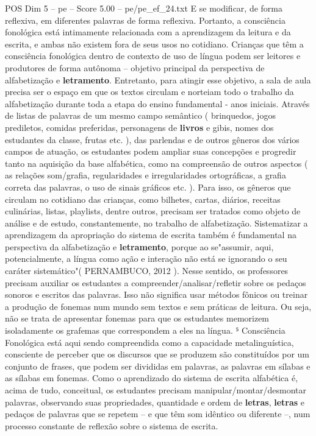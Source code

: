 \begin{textsample}{POS Dim 5 – pe – Score 5.00 – pe/pe\_ef\_24.txt}
E se modificar, de forma reflexiva, em diferentes palavras de forma reflexiva.
Portanto, a consciência fonológica está intimamente relacionada com a aprendizagem da leitura e da escrita, e ambas não existem fora de seus usos no cotidiano.
Crianças que têm a consciência fonológica dentro de contexto de uso de língua podem ser leitores e produtores de forma autônoma – objetivo principal da perspectiva de alfabetização e \textbf{letramento}.
Entretanto, para atingir esse objetivo, a sala de aula precisa ser o espaço em que os textos circulam e norteiam todo o trabalho da alfabetização durante toda a etapa do ensino fundamental - anos iniciais.
Através de listas de palavras de um mesmo campo semântico ( brinquedos, jogos prediletos, comidas preferidas, personagens de \textbf{livros} e gibis, nomes dos estudantes da classe, frutas etc. ), das parlendas e de outros gêneros dos vários campos de atuação, os estudantes podem ampliar suas concepções e progredir tanto na aquisição da base alfabética, como na compreensão de outros aspectos ( as relações som/grafia, regularidades e irregularidades ortográficas, a grafia correta das palavras, o uso de sinais gráficos etc. ).
Para isso, os gêneros que circulam no cotidiano das crianças, como bilhetes, cartas, diários, receitas culinárias, listas, playlists, dentre outros, precisam ser tratados como objeto de análise e de estudo, constantemente, no trabalho de alfabetização.
Sistematizar a aprendizagem da apropriação do sistema de escrita também é fundamental na perspectiva da alfabetização e \textbf{letramento}, porque ao se"assumir, aqui, potencialmente, a língua como ação e interação não está se ignorando o seu caráter sistemático"( PERNAMBUCO, 2012 ).
Nesse sentido, os professores precisam auxiliar os estudantes a compreender/analisar/refletir sobre os pedaços sonoros e escritos das palavras.
Isso não significa usar métodos fônicos ou treinar a produção de fonemas num mundo sem textos e sem práticas de leitura.
Ou seja, não se trata de apresentar fonemas para que os estudantes memorizem isoladamente os grafemas que correspondem a eles na língua. ⁵ Consciência Fonológica está aqui sendo compreendida como a capacidade metalinguística, consciente de perceber que os discursos que se produzem são constituídos por um conjunto de frases, que podem ser divididas em palavras, as palavras em sílabas e as sílabas em fonemas.
Como o aprendizado do sistema de escrita alfabética é, acima de tudo, conceitual, os estudantes precisam manipular/montar/desmontar palavras, observando suas propriedades, quantidade e ordem de \textbf{letras}, \textbf{letras} e pedaços de palavras que se repetem – e que têm som idêntico ou diferente –, num processo constante de reflexão sobre o sistema de escrita.

\end{textsample}
